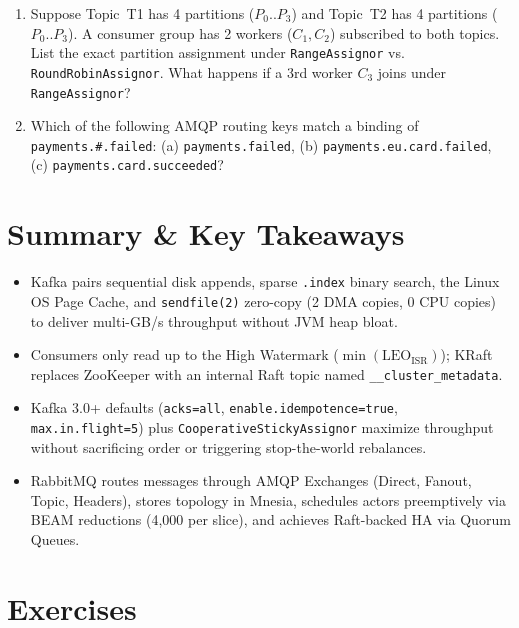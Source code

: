 \begin{tryityourselfbox}
\begin{enumerate}[leftmargin=18pt]
  \item Suppose Topic~T1 has 4 partitions ($P_0..P_3$) and Topic~T2 has 4 partitions ($P_0..P_3$). A consumer group has 2 workers ($C_1, C_2$) subscribed to both topics. List the exact partition assignment under \texttt{RangeAssignor} vs. \texttt{RoundRobinAssignor}. What happens if a 3rd worker $C_3$ joins under \texttt{RangeAssignor}?
  \item Which of the following AMQP routing keys match a binding of \texttt{payments.\#.failed}: (a) \texttt{payments.failed}, (b) \texttt{payments.eu.card.failed}, (c) \texttt{payments.card.succeeded}?
\end{enumerate}
\end{tryityourselfbox}

\section{Summary \protect\& Key Takeaways}
\begin{itemize}[leftmargin=18pt]
  \item Kafka pairs sequential disk appends, sparse \texttt{.index} binary search, the Linux OS Page Cache, and \texttt{sendfile(2)} zero-copy (2 DMA copies, 0 CPU copies) to deliver multi-GB/s throughput without JVM heap bloat.
  \item Consumers only read up to the High Watermark ($\min(\text{LEO}_{\text{ISR}})$); KRaft replaces ZooKeeper with an internal Raft topic named \texttt{\_\_cluster\_metadata}.
  \item Kafka 3.0+ defaults (\texttt{acks=all}, \texttt{enable.idempotence=true}, \texttt{max.in.flight=5}) plus \texttt{CooperativeStickyAssignor} maximize throughput without sacrificing order or triggering stop-the-world rebalances.
  \item RabbitMQ routes messages through AMQP Exchanges (Direct, Fanout, Topic, Headers), stores topology in Mnesia, schedules actors preemptively via BEAM reductions (4,000 per slice), and achieves Raft-backed HA via Quorum Queues.
\end{itemize}

\section{Exercises}

